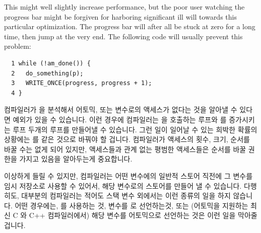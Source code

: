 This might well slightly increase performance, but the poor user
watching the progress bar might be forgiven for harboring significant
ill will towards this particular optimization.
The progress bar will after all be stuck at zero for a long time,
then jump at the very end.
The following code will usually prevent this problem:
\fi

\vspace{5pt}
\begin{minipage}[t]{\columnwidth}
\scriptsize
\begin{verbatim}
  1 while (!am_done()) {
  2   do_something(p);
  3   WRITE_ONCE(progress, progress + 1);
  4 }
\end{verbatim}
\end{minipage}
\vspace{5pt}

컴파일러가  을 분석해서 어토믹, 또는  변수로의
액세스가 없다는 것을 알아낼 수 있다면 예외가 있을 수 있습니다.
이런 경우에 컴파일러는  을 호출하는 루프와  를
증가시키는 루프 두개의 루프를 만들어낼 수 있습니다.
그런 일이 일어날 수 있는 희박한 확률의 상황에는  를
 같은 것으로 바꿔야 할 겁니다.
컴파일러가  액세스의 횟수, 크기, 순서를 바꿀 수는 없게 되어
있지만,  액세스들과 관계 없는 평범한 액세스들은 순서를 바꿀 권한을
가지고 있음을 알아두는게 중요합니다.

이상하게 들릴 수 있지만, 컴파일러는 어떤 변수에의 일반적 스토어 직전에 그
변수를 임시 저장소로 사용할 수 있어서, 해당 변수로의 스토어를 만들어 낼 수
있습니다.
다행히도, 대부분의 컴파일러는 적어도 스택 변수 외에서는 이런 종류의 일을 하지
않습니다.
어떤 경우에는,  를 사용하는 것, 변수를  로
선언하는것, 또는 (어토믹을 지원하는 최신 C 와 C++ 컴파일러에서) 해당 변수를
어토믹으로 선언하는 것은 이런 일을 막아줄 겁니다.
\iffalse

